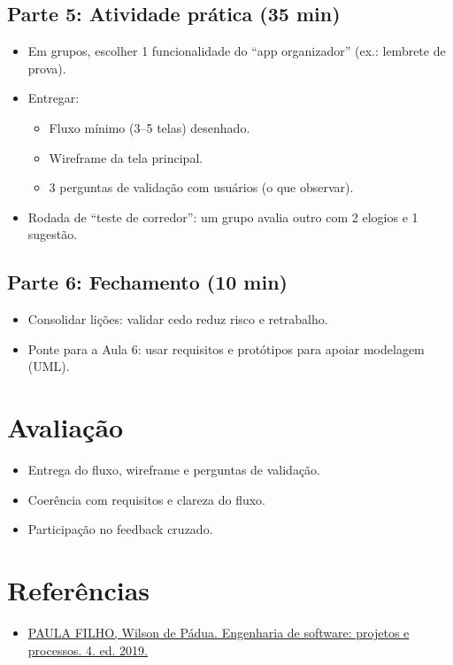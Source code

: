 \documentclass[12pt,a4paper]{article}
\begin{document}
\subsection*{Parte 5: Atividade prática (35 min)}
\begin{itemize}[leftmargin=*,itemsep=0.35em]
  \item Em grupos, escolher 1 funcionalidade do ``app organizador'' (ex.: lembrete de prova).
  \item Entregar:
  \begin{itemize}[leftmargin=*,itemsep=0.25em]
    \item Fluxo mínimo (3--5 telas) desenhado.
    \item Wireframe da tela principal.
    \item 3 perguntas de validação com usuários (o que observar).
  \end{itemize}
  \item Rodada de ``teste de corredor'': um grupo avalia outro com 2 elogios e 1 sugestão.
\end{itemize}

\subsection*{Parte 6: Fechamento (10 min)}
\begin{itemize}[leftmargin=*,itemsep=0.35em]
  \item Consolidar lições: validar cedo reduz risco e retrabalho.
  \item Ponte para a Aula 6: usar requisitos e protótipos para apoiar modelagem (UML).
\end{itemize}

\section{Avaliação}
\begin{itemize}[leftmargin=*,itemsep=0.25em]
  \item Entrega do fluxo, wireframe e perguntas de validação.
  \item Coerência com requisitos e clareza do fluxo.
  \item Participação no feedback cruzado.
\end{itemize}

\section{Referências}
\begin{itemize}[leftmargin=*,itemsep=0.25em]
  \item \href{../99-Materiais/Engenharia%20de%20software%20projetos%20e%20processos%20by%20Wilson%20de%20P%C3%A1dua%20Paula%20Filho%20.epub.pdf}{PAULA FILHO, Wilson de Pádua. Engenharia de software: projetos e processos. 4. ed. 2019.}
\end{itemize}
\end{document}
